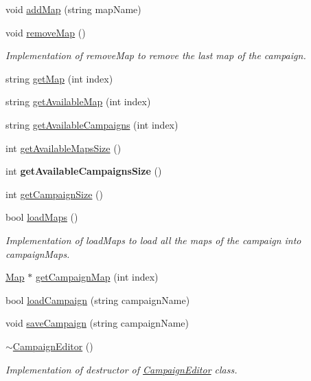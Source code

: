 \begin{DoxyCompactItemize}
void \hyperlink{class_campaign_editor_af034142dc6af33969dd15788881ef238}{add\+Map} (string map\+Name)
\item 
\hypertarget{class_campaign_editor_aeb4ffe0a48aeaab7881beafb5dc03253}{}\label{class_campaign_editor_aeb4ffe0a48aeaab7881beafb5dc03253} 
void \hyperlink{class_campaign_editor_aeb4ffe0a48aeaab7881beafb5dc03253}{remove\+Map} ()
\begin{DoxyCompactList}\small\item\em Implementation of remove\+Map to remove the last map of the campaign. \end{DoxyCompactList}\item 
string \hyperlink{class_campaign_editor_a032797d696d1ef3e092756ea3fb6a8e8}{get\+Map} (int index)
\item 
string \hyperlink{class_campaign_editor_a08c98dcccedb2d109a3eca6ca47f7749}{get\+Available\+Map} (int index)
\item 
string \hyperlink{class_campaign_editor_aab2f6f1c0ae07f3ba60c6c23a85e77de}{get\+Available\+Campaigns} (int index)
\item 
int \hyperlink{class_campaign_editor_ae5046609eeca16a31392bcabcdb1db74}{get\+Available\+Maps\+Size} ()
\item 
\hypertarget{class_campaign_editor_a1f117cb0964d7ebc0b36fe6207d252c4}{}\label{class_campaign_editor_a1f117cb0964d7ebc0b36fe6207d252c4} 
int {\bfseries get\+Available\+Campaigns\+Size} ()
\item 
int \hyperlink{class_campaign_editor_afa6ea5f195b60ff60ceba7625e417613}{get\+Campaign\+Size} ()
\item 
\hypertarget{class_campaign_editor_a9ba86d9aac3530d9837aa739fb655a17}{}\label{class_campaign_editor_a9ba86d9aac3530d9837aa739fb655a17} 
bool \hyperlink{class_campaign_editor_a9ba86d9aac3530d9837aa739fb655a17}{load\+Maps} ()
\begin{DoxyCompactList}\small\item\em Implementation of load\+Maps to load all the maps of the campaign into campaign\+Maps. \end{DoxyCompactList}\item 
\hyperlink{class_map}{Map} $\ast$ \hyperlink{class_campaign_editor_a4524f058b13cb5ab04a65a04c7694550}{get\+Campaign\+Map} (int index)
\item 
bool \hyperlink{class_campaign_editor_ad27545a0bba9e86e5b03d20ca6e8d828}{load\+Campaign} (string campaign\+Name)
\item 
void \hyperlink{class_campaign_editor_a22419d5d2e5ef10d667523e9d113b5c2}{save\+Campaign} (string campaign\+Name)
\item 
\hypertarget{class_campaign_editor_a30a94a60280dfd225d6ec54dc0977b1e}{}\label{class_campaign_editor_a30a94a60280dfd225d6ec54dc0977b1e} 
\hyperlink{class_campaign_editor_a30a94a60280dfd225d6ec54dc0977b1e}{$\sim$\+Campaign\+Editor} ()
\begin{DoxyCompactList}\small\item\em Implementation of destructor of \hyperlink{class_campaign_editor}{Campaign\+Editor} class. \end{DoxyCompactList}\end{DoxyCompactItemize}


